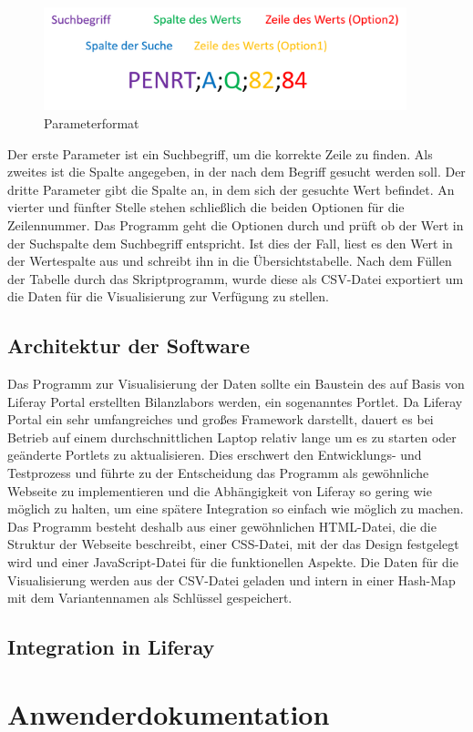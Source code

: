 \begin{figure}[htbp]
	\centering
	\includegraphics[height=30mm]{figures/parameter_format.png}
	\caption[Dateinamenschema]{Parameterformat}
	\label{fig:parameter_format}	
\end{figure}  

Der erste Parameter ist ein Suchbegriff, um die korrekte Zeile zu finden. Als zweites ist die Spalte angegeben, in der nach dem Begriff gesucht werden soll. Der dritte Parameter gibt die Spalte an, in dem sich der gesuchte Wert befindet. An vierter und fünfter Stelle stehen schließlich die beiden Optionen für die Zeilennummer. Das Programm geht die Optionen durch und prüft ob der Wert in der Suchspalte dem Suchbegriff entspricht. Ist dies der Fall, liest es den Wert in der Wertespalte aus und schreibt ihn in die Übersichtstabelle. Nach dem Füllen der Tabelle durch das Skriptprogramm, wurde diese als CSV-Datei exportiert um die Daten für die Visualisierung zur Verfügung zu stellen.

\section{Architektur der Software}
Das Programm zur Visualisierung der Daten sollte ein Baustein des auf Basis von Liferay Portal erstellten Bilanzlabors werden, ein sogenanntes Portlet. Da Liferay Portal ein sehr umfangreiches und großes Framework darstellt, dauert es bei Betrieb auf einem durchschnittlichen Laptop relativ lange um es zu starten oder geänderte Portlets zu aktualisieren. Dies erschwert den Entwicklungs- und Testprozess und führte zu der Entscheidung das Programm als gewöhnliche Webseite zu implementieren und die Abhängigkeit von Liferay so gering wie möglich zu halten, um eine spätere Integration so einfach wie möglich zu machen. Das Programm besteht deshalb aus einer gewöhnlichen HTML-Datei, die die Struktur der Webseite beschreibt, einer CSS-Datei, mit der das Design festgelegt wird und einer JavaScript-Datei für die funktionellen Aspekte. Die Daten für die Visualisierung werden aus der CSV-Datei geladen und intern in einer Hash-Map mit dem Variantennamen als Schlüssel gespeichert.

\section{Integration in Liferay}

\chapter{Anwenderdokumentation}

